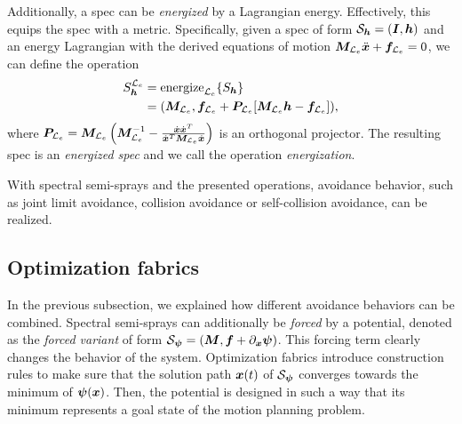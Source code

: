 Additionally, a spec can be \textit{energized} by a Lagrangian energy. Effectively, 
this equips the spec with a metric.
Specifically, given a spec of form $\mathcal{S}_{\bm{h}} = (\bm{I},\bm{h})$ and 
an energy Lagrangian \le{} with the derived equations of motion $\bm{M}_{\mathcal{L}_e}\ddot{\bm{x}} + \bm{f}_{\mathcal{L}_e} =0$, 
we can define the operation
\begin{equation}
  \begin{split}
  S_{\bm{h}}^{\mathcal{L}_e} &= \text{energize}_{\mathcal{L}_e}\{S_{\bm{h}}\} \\
    &= (\bm{M}_{\mathcal{L}_e}, \bm{f}_{\mathcal{L}_e} + \bm{P}_{\mathcal{L}_e}[\bm{M}_{\mathcal{L}_e}\bm{h} - \bm{f}_{\mathcal{L}_e}]), 
  \end{split}
  \label{eq:energization}
\end{equation}
where $\bm{P}_{\mathcal{L}_e} = \bm{M}_{\mathcal{L}_e}\left(\bm{M}_{\mathcal{L}_e}^{-1} - \frac{\dot{\bm{x}}\dot{\bm{x}}^T}{\dot{\bm{x}}^T\bm{M}_{\mathcal{L}_e}\dot{\bm{x}}}\right)$ is an
orthogonal projector. The resulting spec is an \textit{energized spec} and 
we call the operation \textit{energization}.

With spectral semi-sprays and the presented operations,
avoidance behavior, such as joint limit avoidance, collision
avoidance or self-collision avoidance, can be realized.

\subsection{Optimization fabrics}%
\label{sub:optimization_fabrics}
%
In the previous subsection, we explained how different avoidance behaviors can
be combined. Spectral semi-sprays can additionally be \textit{forced} by a
potential, denoted as the \textit{forced variant} of form $\mathcal{S}_{\bm{\psi}} =
\left(\bm{M},\bm{f} + \partial_{\bm{x}}\bm{\psi}\right)$. This forcing term clearly changes the
behavior of the system. Optimization fabrics introduce construction rules to
make sure that the solution path $\bm{x}(t)$ of $\mathcal{S}_{\bm{\psi}}$ converges towards
the minimum of $\bm{\psi}(\bm{x})$. Then, the potential is designed in such a way that
its minimum represents a goal state of the motion planning problem.


